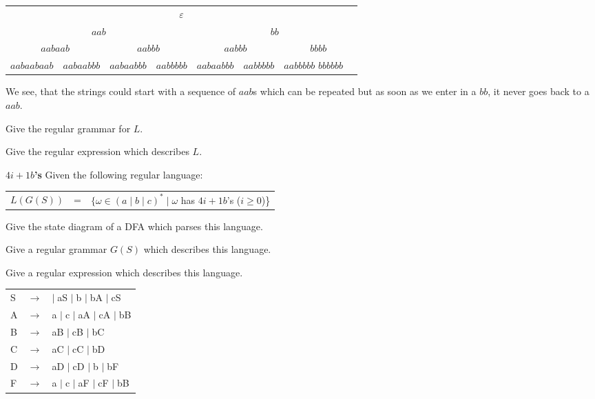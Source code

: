 \documentclass[a4paper]{exam}
\theoremstyle{remark}
\newenvironment{grammar}
	{\begin{tabular}[b]{lcl}}
	{\end{tabular}}
\newcommand{\rewritten}{$\to$}
\newcommand{\alternative}{$\mid \;$}
\begin{document}
\begin{questions}
\begin{parts}
\begin{solution}
			\begin{tabular}{cccccccc}
				\multicolumn{8}{c}{$\varepsilon$} \\
				\multicolumn{4}{c}{$aab$} & \multicolumn{4}{c}{$bb$} \\
				\multicolumn{2}{c}{$aabaab$} & \multicolumn{2}{c}{$aabbb$} & \multicolumn{2}{c}{$aabbb$} & \multicolumn{2}{c}{$bbbb$} \\
				$aabaabaab$ & $aabaabbb$ & $aabaabbb$ & $aabbbbb$ & $aabaabbb$ & $aabbbbb$ & $aabbbbb$ $bbbbbb$ 
			\end{tabular}
			
			We see, that the strings could start with a sequence of $aab$s which can be repeated but as soon as we enter in a $bb$, it never goes back to a $aab$.
		\end{solution}
		\item Give the regular grammar for $L$.
		\item Give the regular expression which describes $L$.
	\end{parts}

	\question
	\textbf{$4i + 1 b$'s}
	Given the following regular language:
	
	\begin{tabular}[b]{lcl}
		$L(G(S))$ & = & $\{\omega \in (a \mid b \mid c)^* \mid \omega$ has $4i + 1 b$'s ($i \geq 0$)\}
	\end{tabular}

	\begin{parts}
		\item Give the state diagram of a DFA which parses this language.
		\item Give a regular grammar $G(S)$ which describes this language.
		\item Give a regular expression which describes this language.		
	\end{parts}
	
	\begin{solution}
	
	\begin{grammar}
		S & \rewritten &  \alternative aS \alternative b \alternative bA \alternative cS \\
		A & \rewritten & a \alternative c \alternative aA \alternative cA \alternative bB \\
		B & \rewritten & aB \alternative cB \alternative bC \\
		C & \rewritten & aC \alternative cC \alternative bD \\
		D & \rewritten & aD \alternative cD \alternative b \alternative bF \\
		F & \rewritten & a \alternative c \alternative aF \alternative cF \alternative bB
	\end{grammar}
	

\end{solution}
\end{questions}
\end{document}
